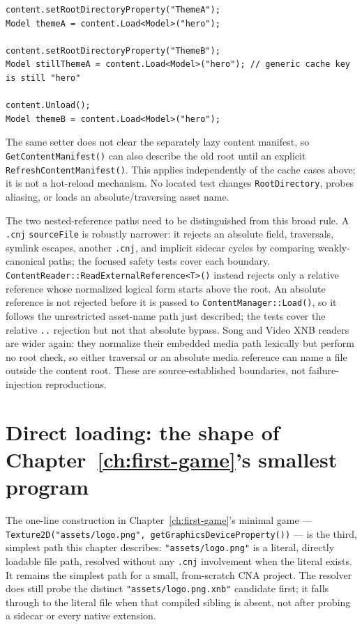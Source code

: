 \begin{lstlisting}
content.setRootDirectoryProperty("ThemeA");
Model themeA = content.Load<Model>("hero");

content.setRootDirectoryProperty("ThemeB");
Model stillThemeA = content.Load<Model>("hero"); // generic cache key is still "hero"

content.Unload();
Model themeB = content.Load<Model>("hero");
\end{lstlisting}

The same setter does not clear the separately lazy content manifest, so
\texttt{GetContentManifest()} can also describe the old root until an explicit
\texttt{RefreshContentManifest()}. This applies independently of the cache cases above; it is
not a hot-reload mechanism. No located test changes \texttt{RootDirectory}, probes aliasing, or
loads an absolute/traversing asset name.

The two nested-reference paths need to be distinguished from this broad rule. A \texttt{.cnj}
\texttt{sourceFile} is robustly narrower: it rejects an absolute field, traversals, symlink
escapes, another \texttt{.cnj}, and implicit sidecar cycles by comparing weakly-canonical paths;
the focused safety tests cover each boundary. \texttt{ContentReader::ReadExternalReference<T>()}
instead rejects only a relative reference whose normalized logical form starts above the root.
An absolute reference is not rejected before it is passed to \texttt{ContentManager::Load()}, so
it follows the unrestricted asset-name path just described; the tests cover the relative
\texttt{..} rejection but not that absolute bypass. Song and Video XNB readers are wider again:
they normalize their embedded media path lexically but perform no root check, so either traversal
or an absolute media reference can name a file outside the content root. These are
source-established boundaries, not failure-injection reproductions.

\section{Direct loading: the shape of Chapter~\ref{ch:first-game}'s smallest program}
\label{sec:direct-loading}

The one-line construction in Chapter~\ref{ch:first-game}'s minimal game ---
\texttt{Texture2D("assets/logo.png", getGraphicsDeviceProperty())} --- is the third, simplest
path this chapter describes: \texttt{"assets/logo.png"} is a literal, directly loadable file
path, resolved without any \texttt{.cnj} involvement when the literal exists. It remains the
simplest path for a small, from-scratch CNA project. The resolver does still probe the distinct
\texttt{"assets/logo.png.xnb"} candidate first; it falls through to the literal file when that
compiled sibling is absent, not after probing a sidecar or every native extension.

